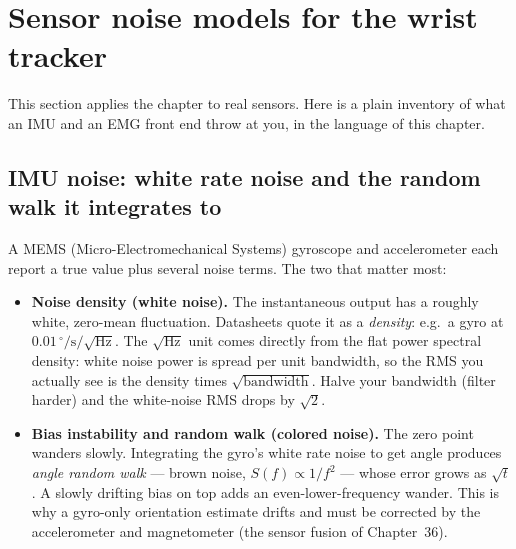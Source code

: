 \section{Sensor noise models for the wrist tracker}
\label{ch20:sensors}

This section applies the chapter to real sensors. Here is a
plain inventory of what an IMU and an EMG front end throw at you, in the
language of this chapter.

\subsection{IMU noise: white rate noise and the random walk it integrates to}

A MEMS (Micro-Electromechanical Systems) gyroscope and accelerometer each report a true value plus several noise
terms. The two that matter most:
\begin{itemize}
  \item \textbf{Noise density (white noise).} The instantaneous output has a
        roughly white, zero-mean fluctuation. Datasheets quote it as a
        \emph{density}: e.g.\ a gyro at $0.01\,^{\circ}/\text{s}/\sqrt{\text{Hz}}$.
        The $\sqrt{\text{Hz}}$ unit comes directly from the flat power spectral density: white noise power is
        spread per unit bandwidth, so the RMS you actually see is the density
        times $\sqrt{\text{bandwidth}}$. Halve your bandwidth (filter harder) and
        the white-noise RMS drops by $\sqrt 2$.
  \item \textbf{Bias instability and random walk (colored noise).} The zero point
        wanders slowly. Integrating the gyro's white rate noise to get angle
        produces \emph{angle random walk} --- brown noise, $S(f)\propto 1/f^2$ ---
        whose error grows as $\sqrt{t}$. A slowly drifting bias on top adds an
        even-lower-frequency wander. This is why a gyro-only
        orientation estimate drifts and must be corrected by the accelerometer
        and magnetometer (the sensor fusion of Chapter~36).
\end{itemize}

